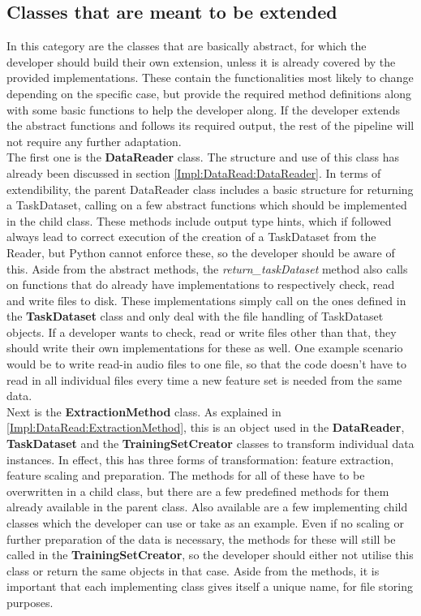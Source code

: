 \subsection{Classes that are meant to be extended}

In this category are the classes that are basically abstract, for which the developer should build their own extension, unless it is already covered by the provided implementations. These contain the functionalities most likely to change depending on the specific case, but provide the required method definitions along with some basic functions to help the developer along. If the developer extends the abstract functions and follows its required output, the rest of the pipeline will not require any further adaptation. \\

The first one is the \textbf{DataReader} class. The structure and use of this class has already been discussed in section \ref{Impl:DataRead:DataReader}. In terms of extendibility, the parent DataReader class includes a basic structure for returning a TaskDataset, calling on a few abstract functions which should be implemented in the child class. These methods include output type hints, which if followed always lead to correct execution of the creation of a TaskDataset from the Reader, but Python cannot enforce these, so the developer should be aware of this. Aside from the abstract methods, the \textit{return\_taskDataset} method also calls on functions that do already have implementations to respectively check, read and write files to disk. These implementations simply call on the ones defined in the \textbf{TaskDataset} class and only deal with the file handling of TaskDataset objects. If a developer wants to check, read or write files other than that, they should write their own implementations for these as well. One example scenario would be to write read-in audio files to one file, so that the code doesn't have to read in all individual files every time a new feature set is needed from the same data.\\



Next is the \textbf{ExtractionMethod} class. As explained in \ref{Impl:DataRead:ExtractionMethod}, this is an object used in the \textbf{DataReader}, \textbf{TaskDataset} and the \textbf{TrainingSetCreator} classes to transform individual data instances. In effect, this has three forms of transformation: feature extraction, feature scaling and preparation. The methods for all of these have to be overwritten in a child class, but there are a few predefined methods for them already available in the parent class. Also available are a few implementing child classes which the developer can use or take as an example. Even if no scaling or further preparation of the data is necessary, the methods for these will still be called in the \textbf{TrainingSetCreator}, so the developer should either not utilise this class or return the same objects in that case. Aside from the methods, it is important that each implementing class gives itself a unique name, for file storing purposes.\\


